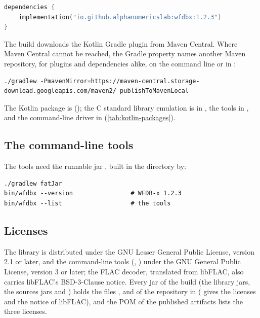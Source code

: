 \begin{lstlisting}[language=Kotlin]
dependencies {
    implementation("io.github.alphanumericslab:wfdbx:1.2.3")
}
\end{lstlisting}

The build downloads the Kotlin Gradle plugin from Maven Central. Where Maven Central
cannot be reached, the Gradle property  names another Maven repository,
for plugins and dependencies alike, on the command line or in
:

\begin{lstlisting}[style=shell]
./gradlew -PmavenMirror=https://maven-central.storage-download.googleapis.com/maven2/ publishToMavenLocal
\end{lstlisting}

The Kotlin package is  (); the C standard library
emulation is in , the tools in , and the command-line
driver in  (\cref{tab:kotlin-packages}).

\subsection{The command-line tools}

The tools need the runnable jar , built in the
directory  by:

\begin{lstlisting}[style=shell]
./gradlew fatJar
bin/wfdbx --version                # WFDB-x 1.2.3
bin/wfdbx --list                   # the tools
\end{lstlisting}

\subsection{Licenses}

The library is distributed under the GNU Lesser General Public License, version 2.1 or
later, and the command-line tools (, ) under the GNU
General Public License, version 3 or later; the FLAC decoder, translated from libFLAC,
also carries libFLAC's BSD-3-Clause notice. Every jar of the build (the library jars, the
sources jars and ) holds the files ,
 and  of the repository in 
( gives the licenses and the notice of libFLAC), and the POM of the
published artifacts lists the three licenses.

